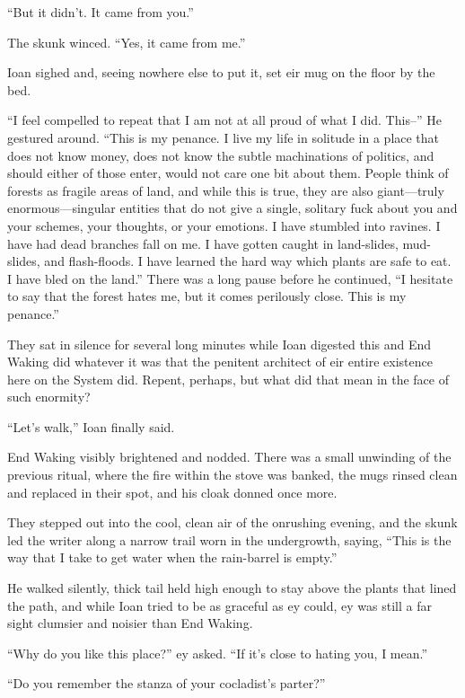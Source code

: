 ``But it didn't. It came from you.''

The skunk winced. ``Yes, it came from me.''

Ioan sighed and, seeing nowhere else to put it, set eir mug on the floor by the bed.

``I feel compelled to repeat that I am not at all proud of what I did. This--'' He gestured around. ``This is my penance. I live my life in solitude in a place that does not know money, does not know the subtle machinations of politics, and should either of those enter, would not care one bit about them. People think of forests as fragile areas of land, and while this is true, they are also giant---truly enormous---singular entities that do not give a single, solitary fuck about you and your schemes, your thoughts, or your emotions. I have stumbled into ravines. I have had dead branches fall on me. I have gotten caught in land-slides, mud-slides, and flash-floods. I have learned the hard way which plants are safe to eat. I have bled on the land.'' There was a long pause before he continued, ``I hesitate to say that the forest hates me, but it comes perilously close. This is my penance.''

They sat in silence for several long minutes while Ioan digested this and End Waking did whatever it was that the penitent architect of eir entire existence here on the System did. Repent, perhaps, but what did that mean in the face of such enormity?

``Let's walk,'' Ioan finally said.

End Waking visibly brightened and nodded. There was a small unwinding of the previous ritual, where the fire within the stove was banked, the mugs rinsed clean and replaced in their spot, and his cloak donned once more.

They stepped out into the cool, clean air of the onrushing evening, and the skunk led the writer along a narrow trail worn in the undergrowth, saying, ``This is the way that I take to get water when the rain-barrel is empty.''

He walked silently, thick tail held high enough to stay above the plants that lined the path, and while Ioan tried to be as graceful as ey could, ey was still a far sight clumsier and noisier than End Waking.

``Why do you like this place?'' ey asked. ``If it's close to hating you, I mean.''

``Do you remember the stanza of your cocladist's parter?''

